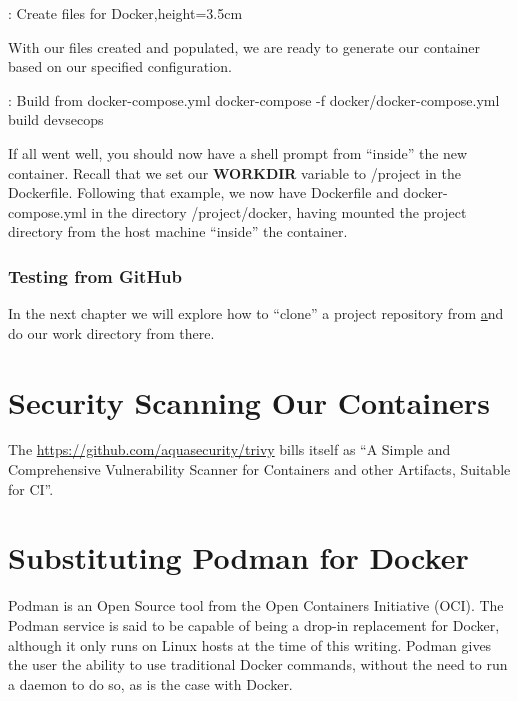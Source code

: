 \justify{}
\begin{mybox}{\thetcbcounter: Create files for Docker,height=3.5cm}
  
\end{mybox}

\justify{}
With our files created and populated, we are ready to generate our
container based on our specified configuration.

\begin{mybox}{\thetcbcounter: Build from docker-compose.yml}
  docker-compose -f docker/docker-compose.yml build devsecops
\end{mybox}

\justify{}
If all went well, you should now have a shell prompt from ``inside'' the
new container. Recall that we set our \textbf{WORKDIR} variable to 
/project in the Dockerfile. Following that example, we now have Dockerfile
and docker-compose.yml in the directory /project/docker, having mounted the
project directory from the host machine ``inside'' the container.

\subsubsection{Testing from GitHub}
\justify{}
In the next chapter we will explore how to ``clone'' a project repository from 
\href{github.com} and do our work directory from there.

\section{Security Scanning Our Containers}
The \href{trivy container scanner}{https://github.com/aquasecurity/trivy} bills itself
as ``A Simple and Comprehensive Vulnerability Scanner for Containers and other
Artifacts, Suitable for CI''.

\section{Substituting Podman for Docker}
\justify{}
Podman is an Open Source tool from the Open
Containers Initiative (OCI). The Podman service is said to be capable
of being a drop-in replacement for Docker, although it only
runs on Linux hosts at the time of this writing. Podman gives
the user the ability to use traditional Docker commands,
without the need to run a daemon to do so\cite{podman}, as is
the case with Docker.

